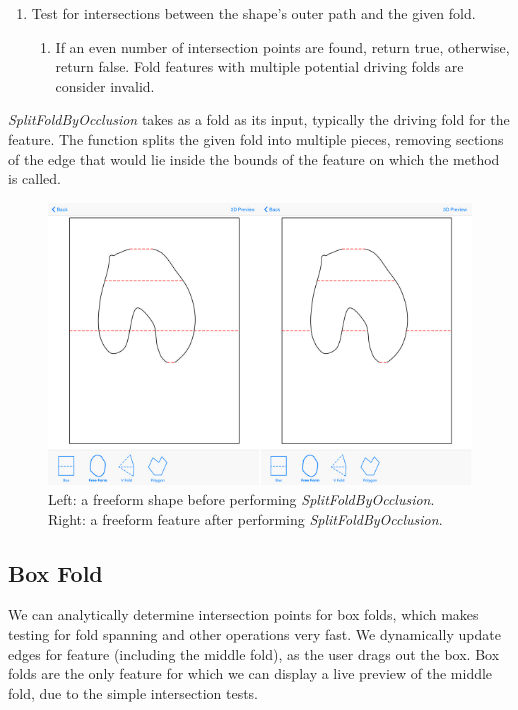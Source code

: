 \begin{enumerate}
\def\labelenumi{\arabic{enumi})}
\itemsep1pt\parskip0pt
\item
  Test for intersections between the shape's outer path and the given
  fold.

  \begin{enumerate}
  \def\labelenumii{(\alph{enumii})}
  \itemsep1pt\parskip0pt
  \item
    If an even number of intersection points are found, return true,
    otherwise, return false. Fold features with multiple potential
    driving folds are consider invalid.
  \end{enumerate}
\end{enumerate}

\emph{SplitFoldByOcclusion} takes as a fold as its input, typically the
driving fold for the feature. The function splits the given fold into
multiple pieces, removing sections of the edge that would lie inside the
bounds of the feature on which the method is called.

\begin{figure}[htbp]
\centering
\includegraphics{figures/41_Tech_Tool_Implementation/splitfoldbyOcclusionBeforeAfter.pdf}
\caption{Left: a freeform shape before performing
\emph{SplitFoldByOcclusion}. Right: a freeform feature after performing
\emph{SplitFoldByOcclusion}.}
\end{figure}

\subsection{Box Fold}\label{box-fold}

We can analytically determine intersection points for box folds, which
makes testing for fold spanning and other operations very fast. We
dynamically update edges for feature (including the middle fold), as the
user drags out the box. Box folds are the only feature for which we can
display a live preview of the middle fold, due to the simple
intersection tests.

